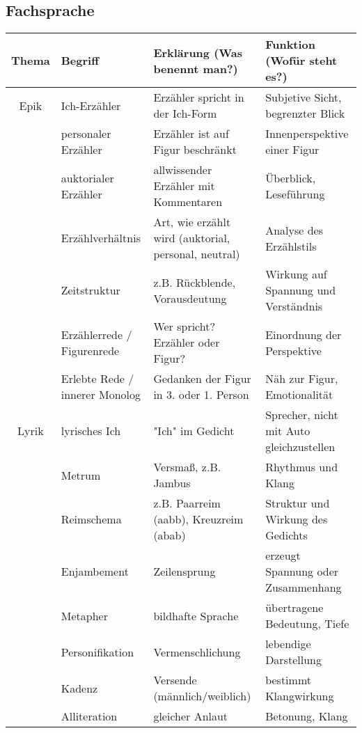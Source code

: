 
\subsection{Fachsprache}
\setlength{\tabcolsep}{4pt}

\renewcommand{\arraystretch}{1.3}
\begin{tabularx}{\textwidth}{|c|p{2.5cm}|X|X|}
    \hline
    Thema & Begriff & Erklärung (Was benennt man?) & Funktion (Wofür steht es?) \\
    \hline
    \hline
    Epik & Ich-Erzähler & Erzähler spricht in der Ich-Form & Subjetive Sicht, begrenzter Blick \\
    \hline 
    & personaler Erzähler & Erzähler ist auf Figur beschränkt & Innenperspektive einer Figur \\
    \hline 
    & auktorialer Erzähler & allwissender Erzähler mit Kommentaren & Überblick, Leseführung \\
    \hline
    & Erzählverhältnis & Art, wie erzählt wird (auktorial, personal, neutral) & Analyse des Erzählstils \\
    \hline
    & Zeitstruktur & z.B. Rückblende, Vorausdeutung & Wirkung auf Spannung und Verständnis \\
    \hline
    & Erzählerrede / Figurenrede & Wer spricht? Erzähler oder Figur? & Einordnung der Perspektive \\
    \hline
    & Erlebte Rede / innerer Monolog & Gedanken der Figur in 3. oder 1. Person & Näh zur Figur, Emotionalität \\
    \hline
    Lyrik & lyrisches Ich & "Ich" im Gedicht & Sprecher, nicht mit Auto gleichzustellen \\
    \hline
    & Metrum & Versmaß, z.B. Jambus & Rhythmus und Klang \\
    \hline
    & Reimschema & z.B.  Paarreim (aabb), Kreuzreim (abab) & Struktur  und Wirkung des Gedichts \\
    \hline
    & Enjambement & Zeilensprung & erzeugt Spannung oder Zusammenhang \\
    \hline
    & Metapher & bildhafte Sprache & übertragene Bedeutung, Tiefe \\
    \hline
    & Personifikation & Vermenschlichung & lebendige Darstellung \\
    \hline
    & Kadenz & Versende (männlich/weiblich) & bestimmt Klangwirkung \\
    \hline
    & Alliteration & gleicher Anlaut & Betonung, Klang \\

\end{tabularx}
